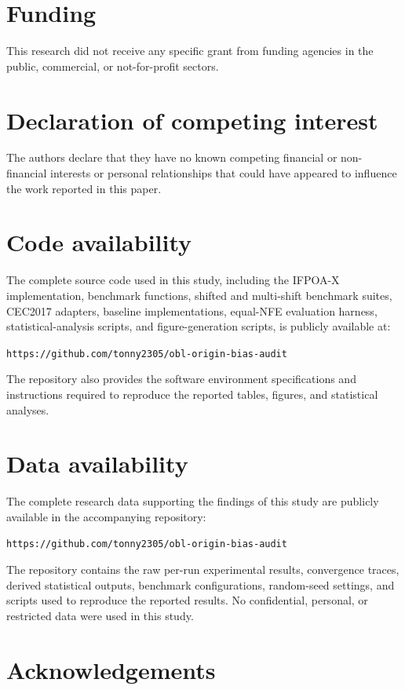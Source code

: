 \documentclass[preprint,12pt]{elsarticle}
\begin{document}
\section*{Funding}

This research did not receive any specific grant from funding agencies in the public, commercial, or not-for-profit sectors.

\section*{Declaration of competing interest}

The authors declare that they have no known competing financial or non-financial interests or personal relationships that could have appeared to influence the work reported in this paper.

\section*{Code availability}

The complete source code used in this study, including the IFPOA-X implementation, benchmark functions, shifted and multi-shift benchmark suites, CEC2017 adapters, baseline implementations, equal-NFE evaluation harness, statistical-analysis scripts, and figure-generation scripts, is publicly available at:

\texttt{https://github.com/tonny2305/obl-origin-bias-audit}

The repository also provides the software environment specifications and instructions required to reproduce the reported tables, figures, and statistical analyses.

\section*{Data availability}

The complete research data supporting the findings of this study are publicly available in the accompanying repository:

\texttt{https://github.com/tonny2305/obl-origin-bias-audit}

The repository contains the raw per-run experimental results, convergence traces, derived statistical outputs, benchmark configurations, random-seed settings, and scripts used to reproduce the reported results. No confidential, personal, or restricted data were used in this study.

\section*{Acknowledgements}
\end{document}
